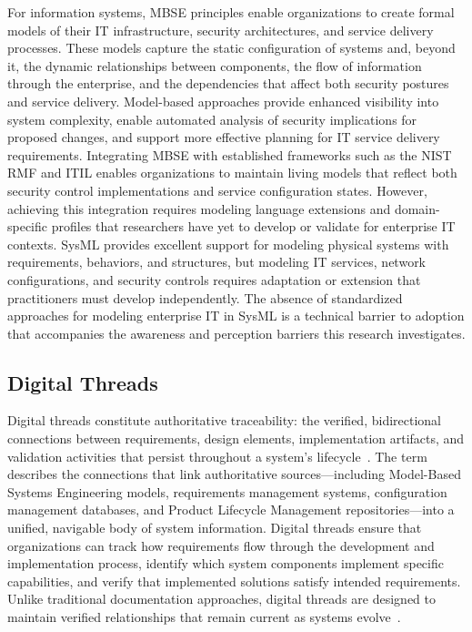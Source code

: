 For information systems, MBSE principles enable organizations to create formal models of their IT infrastructure, security architectures, and service delivery processes. These models capture the static configuration of systems and, beyond it, the dynamic relationships between components, the flow of information through the enterprise, and the dependencies that affect both security postures and service delivery. Model-based approaches provide enhanced visibility into system complexity, enable automated analysis of security implications for proposed changes, and support more effective planning for IT service delivery requirements. Integrating MBSE with established frameworks such as the NIST RMF and ITIL enables organizations to maintain living models that reflect both security control implementations and service configuration states. However, achieving this integration requires modeling language extensions and domain-specific profiles that researchers have yet to develop or validate for enterprise IT contexts. SysML provides excellent support for modeling physical systems with requirements, behaviors, and structures, but modeling IT services, network configurations, and security controls requires adaptation or extension that practitioners must develop independently. The absence of standardized approaches for modeling enterprise IT in SysML is a technical barrier to adoption that accompanies the awareness and perception barriers this research investigates.

\subsection{Digital Threads}

Digital threads constitute authoritative traceability: the verified, bidirectional connections between requirements, design elements, implementation artifacts, and validation activities that persist throughout a system's lifecycle~\parencite{Singh_Willcox_2018}. The term describes the connections that link authoritative sources---including Model-Based Systems Engineering models, requirements management systems, configuration management databases, and Product Lifecycle Management repositories---into a unified, navigable body of system information. Digital threads ensure that organizations can track how requirements flow through the development and implementation process, identify which system components implement specific capabilities, and verify that implemented solutions satisfy intended requirements. Unlike traditional documentation approaches, digital threads are designed to maintain verified relationships that remain current as systems evolve~\parencite{Zhang_DigitalThread_2024}.

